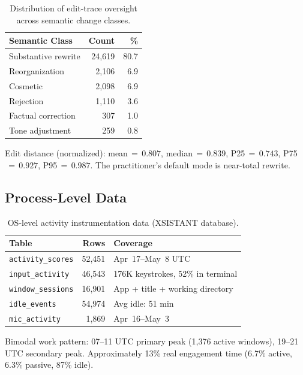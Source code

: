 \documentclass[11pt]{article}
\begin{document}
\begin{table}[h]
\centering
\caption{Distribution of edit-trace oversight across semantic change classes.}
\label{tab:edit-distribution}
\begin{tabular}{@{}lrr@{}}
\toprule
\textbf{Semantic Class} & \textbf{Count} & \textbf{\%} \\
\midrule
Substantive rewrite   & 24{,}619 & 80.7 \\
Reorganization        & 2{,}106  & 6.9  \\
Cosmetic              & 2{,}098  & 6.9  \\
Rejection             & 1{,}110  & 3.6  \\
Factual correction    & 307      & 1.0  \\
Tone adjustment       & 259      & 0.8  \\
\bottomrule
\end{tabular}
\end{table}

Edit distance (normalized): mean$\,{=}\,0.807$, median$\,{=}\,\mathbf{0.839}$, P25$\,{=}\,0.743$, P75$\,{=}\,0.927$, P95$\,{=}\,0.987$.
The practitioner's default mode is near-total rewrite.

\subsection{Process-Level Data}

\begin{table}[h]
\centering
\caption{OS-level activity instrumentation data (XSISTANT database).}
\label{tab:process-data}
\begin{tabular}{@{}lrl@{}}
\toprule
\textbf{Table} & \textbf{Rows} & \textbf{Coverage} \\
\midrule
\texttt{activity\_scores}  & 52{,}451 & Apr~17--May~8 UTC \\
\texttt{input\_activity}   & 46{,}543 & 176K keystrokes, 52\% in terminal \\
\texttt{window\_sessions}  & 16{,}901 & App + title + working directory \\
\texttt{idle\_events}      & 54{,}974 & Avg idle: 51 min \\
\texttt{mic\_activity}     & 1{,}869  & Apr~16--May~3 \\
\bottomrule
\end{tabular}
\end{table}

Bimodal work pattern: 07--11 UTC primary peak (1{,}376 active windows), 19--21 UTC secondary peak.
Approximately 13\% real engagement time (6.7\% active, 6.3\% passive, 87\% idle).
\end{document}
